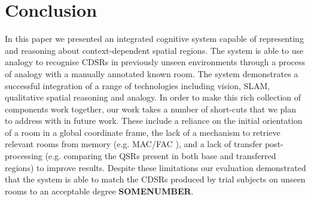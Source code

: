 \documentclass[letterpaper]{article}
\begin{document}

\section{Conclusion}

In this paper we presented an integrated cognitive system capable of representing and reasoning about context-dependent spatial regions. The system is able to use analogy to recognise CDSRs in previously unseen environments through a process of analogy with a manually annotated known room. The system demonstrates a successful integration of a range of technologies including vision, SLAM, qualitative spatial reasoning and analogy. In order to make this rich collection of components work together, our work takes a number of short-cuts that we plan to address with in future work. These include a reliance on the initial orientation of a room in a global coordinate frame, the lack of a mechanism to retrieve relevant rooms from memory (e.g. MAC/FAC \cite{forbus/etal1995}), and a lack of transfer post-processing (e.g. comparing the QSRs present in both base and transferred regions) to improve results. Despite these limitations our evaluation demonstrated that the system is able to match the CDSRs produced by trial subjects on unseen rooms to an acceptable degree \textbf{SOMENUMBER}.


% 

\clearpage



\end{document}
